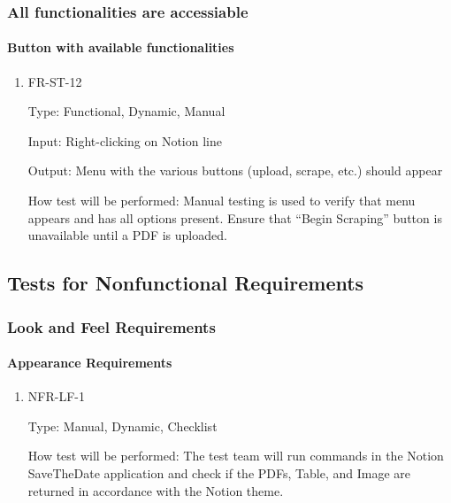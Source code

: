 \documentclass[12pt, titlepage]{article}
\begin{document}
\subsubsection{All functionalities are accessiable}

\paragraph{Button with available functionalities}

\begin{enumerate}

\item{FR-ST-12\\}

Type: Functional, Dynamic, Manual 

Input: Right-clicking on Notion line 

Output: Menu with the various buttons (upload, scrape, etc.) should appear 

How test will be performed: Manual testing is used to verify that menu appears and has all options present. Ensure that “Begin Scraping” button is unavailable until a PDF is uploaded.

\end{enumerate}

\subsection{Tests for Nonfunctional Requirements}

\subsubsection{Look and Feel Requirements}
		
\paragraph{Appearance Requirements}

\begin{enumerate}

\item{NFR-LF-1\\}

Type: Manual, Dynamic, Checklist 

How test will be performed: The test team will run commands in the Notion SaveTheDate application and check if the PDFs, Table, and Image are returned in accordance with the Notion theme. 

\end{enumerate}
\end{document}
